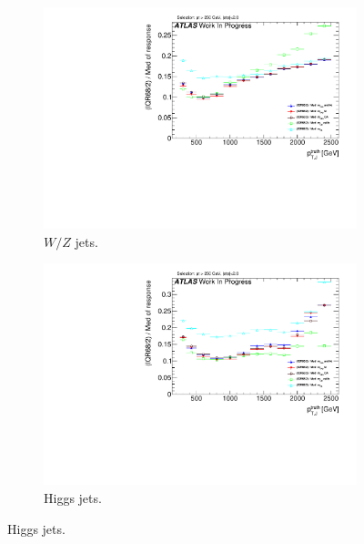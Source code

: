 \begin{figure}
    \centering
    \begin{subfigure}[b]{0.45\textwidth}
        \centering
   \includegraphics[width=\textwidth]{jet_part/mtas/71graphcftr_h_JetRatio_mJ12CALOIQRoM_Wprime_Allalgos.pdf}
    \caption{$W/Z$ jets.}
    \label{fig:allalgow}
    \end{subfigure}
    \begin{subfigure}[b]{0.45\textwidth}
        \centering
   \includegraphics[width=\textwidth]{jet_part/mtas/71graphcftr_h_JetRatio_mJ12CALOIQRoMHiggsNOCalib.pdf}
    \caption{Higgs jets.}
    \label{fig:allalgohiggs}
    \end{subfigure}


\end{figure}
